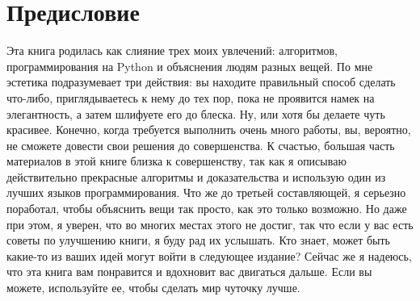 \chapter*{Предисловие}



Эта книга родилась как слияние трех моих увлечений: алгоритмов, программирования на Python и объяснения людям разных вещей. По мне эстетика подразумевает три действия: вы находите правильный способ сделать что-либо, приглядываетесь к нему до тех пор, пока не проявится намек на элегантность, а затем шлифуете его до блеска. Ну, или хотя бы делаете чуть красивее. Конечно, когда требуется выполнить очень много работы, вы, вероятно, не сможете довести свои решения до совершенства. К счастью, большая часть материалов в этой книге близка к совершенству, так как я описываю действительно прекрасные алгоритмы и доказательства и использую один из лучших языков программирования. Что же до третьей составляющей, я серьезно поработал, чтобы объяснить вещи так просто, как это только возможно. Но даже при этом, я уверен, что во многих местах этого не достиг, так что если у вас есть советы по улучшению книги, я буду рад их услышать. Кто знает, может быть какие-то из ваших идей могут войти в следующее издание? Сейчас же я надеюсь, что эта книга вам понравится и вдохновит вас двигаться дальше. Если вы можете, используйте ее, чтобы сделать мир чуточку лучше.
